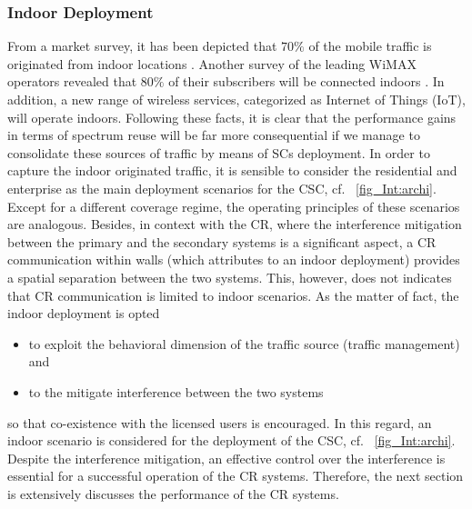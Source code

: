 \subsubsection*{Indoor Deployment}
From a market survey, it has been depicted that $70\%$ of the mobile traffic is originated from indoor locations \cite{Chander08}. Another survey of the leading WiMAX operators revealed that $80\%$ of their subscribers will be connected indoors \cite{Pao07}. In addition, a new range of wireless services, categorized as Internet of Things (IoT), will operate indoors. Following these facts, it is clear that the performance gains in terms of spectrum reuse will be far more consequential if we manage to consolidate these sources of traffic by means of SCs deployment. In order to capture the indoor originated traffic, it is sensible to consider the residential and enterprise as the main deployment scenarios for the CSC, cf. \figurename~\ref{fig_Int:archi}. Except for a different coverage regime, the operating principles of these scenarios are analogous. Besides, in context with the CR, where the interference mitigation between the primary and the secondary systems is a significant aspect, a CR communication within walls (which attributes to an indoor deployment) provides a spatial separation between the two systems. This, however, does not indicates that CR communication is limited to indoor scenarios. As the matter of fact, the indoor deployment is opted \begin{itemize} \item to exploit the behavioral dimension of the traffic source (traffic management) and \item to the mitigate interference between the two systems \end{itemize} so that co-existence with the licensed users is encouraged. 
In this regard, an indoor scenario is considered for the deployment of the CSC, cf. \figurename~\ref{fig_Int:archi}. Despite the interference mitigation, an effective control over the interference is essential for a successful operation of the CR systems. Therefore, the next section is extensively discusses the performance of the CR systems. 

